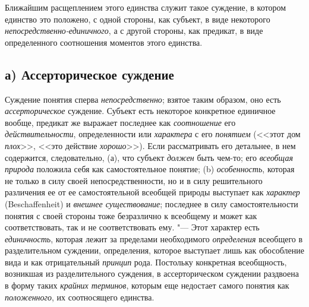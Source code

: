 Ближайшим расщеплением этого единства служит такое суждение, в
котором единство это положено, с одной стороны, как субъект, в виде
некоторого
{\em непосредственно-единичного},
а с другой стороны, как предикат, в виде определенного
соотношения моментов этого единства.

\subsection[а) Ассерторическое суждение]{а) Ассерторическое суждение}
Суждение понятия сперва
{\em непосредственно};
взятое таким образом, оно есть
{\em ассерторическое}
суждение. Субъект есть некоторое конкретное единичное вообще,
предикат же выражает последнее как
{\em соотношение} его
{\em действительности},
определенности или
{\em характера} с его
{\em понятием} (<<этот дом
{\em плох}>>, <<это
действие {\em хорошо}>>).
Если рассматривать его детальнее, в нем содержится,
следовательно, (а), что субъект
{\em должен} быть чем-то;
его {\em всеобщая природа}
положила себя как самостоятельное понятие; (b)
{\em особенность},
которая не только в силу своей непосредственности, но и в
силу решительного различения ее от ее самостоятельной всеобщей природы
выступает как {\em характер}
(Beschaffenheit) и
{\em внешнее существование};
последнее в силу самостоятельности понятия с своей стороны
тоже безразлично к всеобщему и может как соответствовать, так и не
соответствовать ему. "--- Этот характер есть
{\em единичность},
которая лежит за пределами необходимого
{\em определения}
всеобщего в разделительном суждении, определения, которое
выступает лишь как обособление вида и как отрицательный
{\em принцип} рода.
Постольку конкретная всеобщность, возникшая из разделительного суждения, в
ассерторическом суждении раздвоена в форму таких
{\em крайних терминов},
которым еще недостает самого понятия как
{\em положенного}, их
соотносящего
единства.

